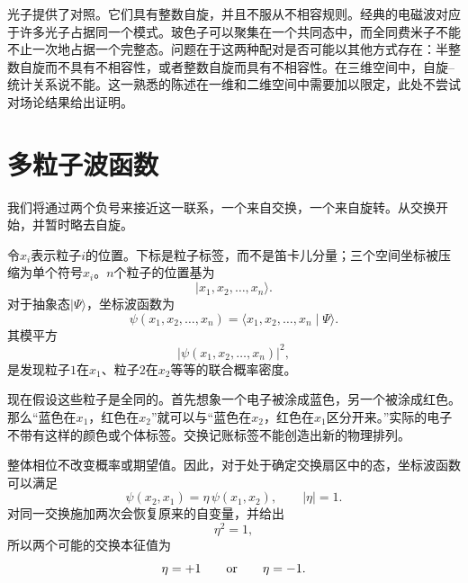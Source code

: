 光子提供了对照。它们具有整数自旋，并且不服从不相容规则。经典的电磁波对应于许多光子占据同一个模式。玻色子可以聚集在一个共同态中，而全同费米子不能不止一次地占据一个完整态。问题在于这两种配对是否可能以其他方式存在：半整数自旋而不具有不相容性，或者整数自旋而具有不相容性。在三维空间中，自旋--统计关系说不能。这一熟悉的陈述在一维和二维空间中需要加以限定，此处不尝试对场论结果给出证明。

\begin{classroomqa}
\end{classroomqa}

\section{多粒子波函数}

我们将通过两个负号来接近这一联系，一个来自交换，一个来自旋转。从交换开始，并暂时略去自旋。

令\(x_i\)表示粒子\(i\)的位置。下标是粒子标签，而不是笛卡儿分量；三个空间坐标被压缩为单个符号\(x_i\)。\(n\)个粒子的位置基为
\begin{equation}
\lvert x_1,x_2,\ldots,x_n\rangle.
\end{equation}
对于抽象态\(\lvert\Psi\rangle\)，坐标波函数为
\begin{equation}
\psi(x_1,x_2,\ldots,x_n)
=
\langle x_1,x_2,\ldots,x_n\mid\Psi\rangle.
\end{equation}
其模平方
\begin{equation}
\bigl\lvert\psi(x_1,x_2,\ldots,x_n)\bigr\rvert^2,
\end{equation}
是发现粒子\(1\)在\(x_1\)、粒子\(2\)在\(x_2\)等等的联合概率密度。

现在假设这些粒子是全同的。首先想象一个电子被涂成蓝色，另一个被涂成红色。那么``蓝色在\(x_1\)，红色在\(x_2\)''就可以与``蓝色在\(x_2\)，红色在\(x_1\)区分开来。''实际的电子不带有这样的颜色或个体标签。交换记账标签不能创造出新的物理排列。

整体相位不改变概率或期望值。因此，对于处于确定交换扇区中的态，坐标波函数可以满足
\begin{equation}
\psi(x_2,x_1)=\eta\,\psi(x_1,x_2),
\qquad
\lvert\eta\rvert=1.
\end{equation}
对同一交换施加两次会恢复原来的自变量，并给出
\begin{equation}
\eta^2=1,
\end{equation}
所以两个可能的交换本征值为
\begin{equation}
\eta=+1
\qquad\hbox{or}\qquad
\eta=-1.
\end{equation}

